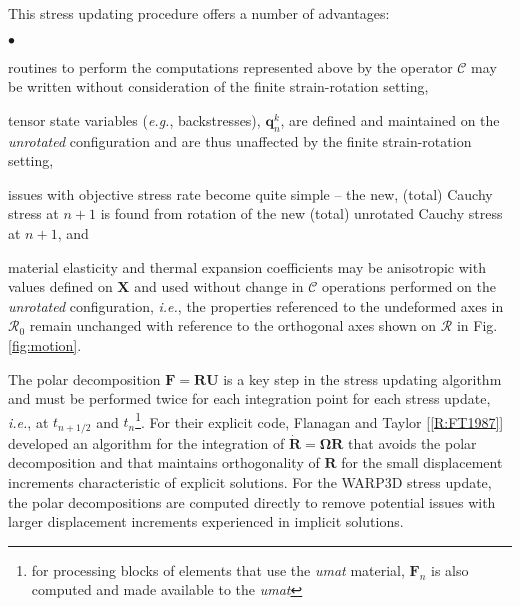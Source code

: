 \documentclass[11pt]{report}
\numberwithin{equation}{section}
\newcommand{\bmf } {\boldsymbol }  %
\newcommand{\eg}{\emph{e.g.},\xspace}
\newcommand{\ie}{\emph{i.e.},\xspace}
\newcommand{\ti}{\emph}
\newcommand{\nid}{\noindent}
\newcommand{\region}{\bm{\mathcal{R}}}
\newcommand{\squishlist}{
 \begin{list}{$\bullet$}
  { \setlength{\itemsep}{0pt}
     \setlength{\parsep}{3pt}
     \setlength{\topsep}{3pt}
     \setlength{\partopsep}{0pt}
     \setlength{\leftmargin}{1.5em}
     \setlength{\labelwidth}{1em}
     \setlength{\labelsep}{0.5em} } }
\newcommand{\squishend}{
  \end{list}  }
\begin{document}
\nid This stress updating procedure offers a number of advantages:  
\small
\squishlist
\item routines to perform
the computations represented above by  the operator $\mathcal{C}$ may be written without
consideration of the finite strain-rotation setting, 
\item tensor state variables (\eg backstresses),
$\mathbf{q}_n^k$, are defined and maintained on the \ti{unrotated}
configuration and are thus unaffected by the finite strain-rotation setting,  
\item issues
with objective stress rate become quite simple -- the new, (total) Cauchy stress at $n+1$ is found from
rotation of the new (total) unrotated Cauchy stress at $n+1$, and 
\item
material elasticity and thermal expansion coefficients
may be anisotropic with values defined on $\bmf X$ and used without
change in  $\mathcal{C}$ operations performed on the \ti{unrotated} configuration, \ie
the properties referenced to the undeformed axes in $\region_0$ remain
unchanged with reference to the orthogonal axes shown on $\region$ in Fig. \ref{fig:motion}.
%
\squishend
\normalsize

\nid{\bf{\ti{Polar Decomposition}}}

\nid The polar decomposition $\mathbf{F=RU}$ is a key step in the stress updating algorithm 
and must be performed twice for each integration point for each stress update, \ie
 at $t_{n+1/2}$ and $t_n$\footnote{for processing blocks of elements
 that use the \ti{umat} material, $\mathbf{F}_n$ is also computed and
 made available to the \ti{umat}}. For  their explicit code, 
 Flanagan and Taylor [\ref{R:FT1987}] developed an algorithm for the integration of 
 $\dot{\mathbf{R} }= \mathbf{\Omega}\mathbf{R}$ that 
avoids the polar decomposition and that
maintains orthogonality of  $\mathbf{R}$  for the small displacement 
increments characteristic of explicit solutions. For the 
WARP3D stress update, the polar decompositions are computed
directly  to remove potential issues with larger displacement increments
experienced in implicit solutions.
 
\end{document}

